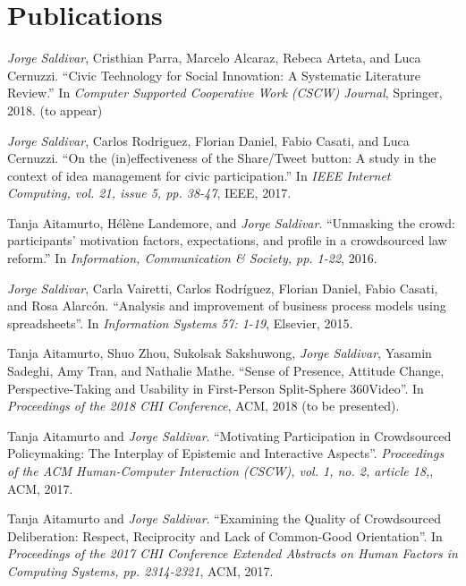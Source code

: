 
\section{Publications}


\textit{Jorge Saldivar}, Cristhian Parra, Marcelo Alcaraz, Rebeca Arteta, and Luca Cernuzzi. ``Civic Technology for Social Innovation: A Systematic Literature Review.'' In \textit{Computer Supported Cooperative Work (CSCW) Journal}, Springer, 2018. (to appear)

\textit{Jorge Saldivar}, Carlos Rodriguez, Florian Daniel, Fabio Casati, and Luca Cernuzzi. ``On the (in)effectiveness of the Share/Tweet button: A study in the context of idea management for civic participation.'' In \textit{IEEE Internet Computing, vol. 21, issue 5, pp. 38-47}, IEEE, 2017.

Tanja Aitamurto, Hélène Landemore, and \textit{Jorge Saldivar}. ``Unmasking the crowd: participants’ motivation factors, expectations, and profile in a crowdsourced law reform.'' In \textit{Information, Communication \& Society, pp. 1-22}, 2016.

\textit{Jorge Saldivar}, Carla Vairetti, Carlos Rodríguez, Florian Daniel, Fabio Casati, and Rosa Alarcón. ``Analysis and improvement of business process models using spreadsheets''. In \textit{Information Systems 57: 1-19}, Elsevier, 2015.


Tanja Aitamurto, Shuo Zhou, Sukolsak Sakshuwong, \textit{Jorge Saldivar}, Yasamin Sadeghi, Amy Tran, and Nathalie Mathe. ``Sense of Presence, Attitude Change, Perspective-Taking and Usability in First-Person Split-Sphere 360\degree Video''. In \textit{Proceedings of the 2018 CHI Conference}, ACM, 2018 (to be presented).

Tanja Aitamurto and \textit{Jorge Saldivar}. ``Motivating Participation in Crowdsourced Policymaking: The Interplay of Epistemic and Interactive Aspects''. \textit{Proceedings of the ACM Human-Computer Interaction (CSCW), vol. 1, no. 2, article 18,}, ACM, 2017.

Tanja Aitamurto and \textit{Jorge Saldivar}. ``Examining the Quality of Crowdsourced Deliberation: Respect, Reciprocity and Lack of Common-Good Orientation''. In \textit{Proceedings of the 2017 CHI Conference Extended Abstracts on Human Factors in Computing Systems, pp. 2314-2321}, ACM, 2017.

